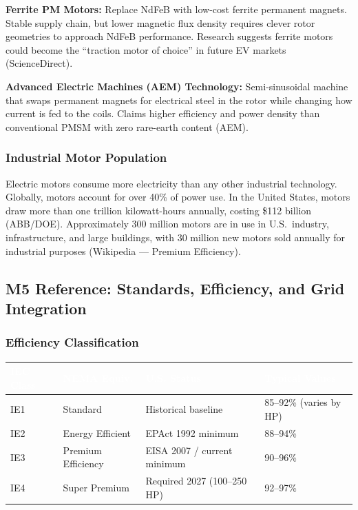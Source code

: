 \documentclass[11pt,letterpaper]{article}
\newcommand{\tableheader}[1]{\textbf{\sffamily\textcolor{white}{#1}}}
\begin{document}
\textbf{Ferrite PM Motors:} Replace NdFeB with low-cost ferrite permanent magnets. Stable supply chain, but lower magnetic flux density requires clever rotor geometries to approach NdFeB performance. Research suggests ferrite motors could become the ``traction motor of choice'' in future EV markets (ScienceDirect).

\textbf{Advanced Electric Machines (AEM) Technology:} Semi-sinusoidal machine that swaps permanent magnets for electrical steel in the rotor while changing how current is fed to the coils. Claims higher efficiency and power density than conventional PMSM with zero rare-earth content (AEM).

\subsubsection{Industrial Motor Population}

Electric motors consume more electricity than any other industrial technology. Globally, motors account for over 40\% of power use. In the United States, motors draw more than one trillion kilowatt-hours annually, costing \$112 billion (ABB/DOE). Approximately 300 million motors are in use in U.S.\ industry, infrastructure, and large buildings, with 30 million new motors sold annually for industrial purposes (Wikipedia --- Premium Efficiency).

\subsection{M5 Reference: Standards, Efficiency, and Grid Integration}

\subsubsection{Efficiency Classification}

\begin{center}
\begin{tabularx}{\textwidth}{C{1.8cm}L{3cm}L{3cm}X}
\toprule
{}
\tableheader{IEC Class} & \tableheader{NEMA Equiv.} & \tableheader{U.S. Status} & \tableheader{Typical Values} \\
\midrule
IE1 & Standard & Historical baseline & 85--92\% (varies by HP) \\
IE2 & Energy Efficient & EPAct 1992 minimum & 88--94\% \\
IE3 & Premium Efficiency & EISA 2007 / current minimum & 90--96\% \\
IE4 & Super Premium & Required 2027 (100--250 HP) & 92--97\% \\
\bottomrule
\end{tabularx}
\end{center}
\end{document}
